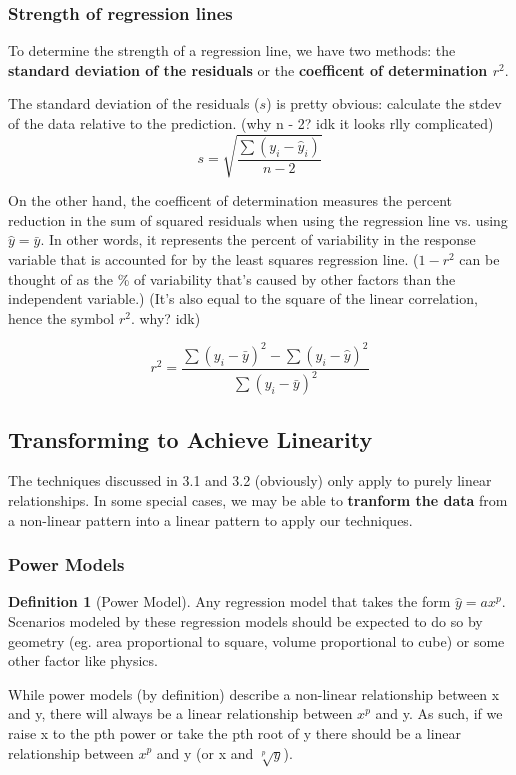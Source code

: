 \documentclass[12pt, a4paper]{article}
\theoremstyle{definition}
\newtheorem{definition}{Definition}
\begin{document}
\subsubsection{Strength of regression lines}

To determine the strength of a regression line, we have two methods: the \textbf{standard deviation of the residuals} or the \textbf{coefficent of determination $r^2$}.

The standard deviation of the residuals ($s$) is pretty obvious: calculate the stdev of the data relative to the prediction. (why n - 2? idk it looks rlly complicated)
\[s = \sqrt{\frac{\sum (y_i - \hat{y}_i)}{n - 2}}\]

On the other hand, the coefficent of determination measures the percent reduction in the sum of squared residuals when using the regression line vs. using $\hat{y} = \bar{y}$.
In other words, it represents the percent of variability in the response variable that is accounted for by the least squares regression line.
($1 - r^2$ can be thought of as the \% of variability that's caused by other factors than the independent variable.)
(It's also equal to the square of the linear correlation, hence the symbol $r^2$. why? idk)

\[r^2 = \frac{\sum (y_i - \bar{y})^2 - \sum (y_i - \hat{y})^2}{\sum (y_i - \bar{y})^2}\]

\subsection{Transforming to Achieve Linearity}

The techniques discussed in 3.1 and 3.2 (obviously) only apply to purely linear relationships.
In some special cases, we may be able to \textbf{tranform the data} from a non-linear pattern into a linear pattern to apply our techniques.

\subsubsection{Power Models}
\begin{definition}[Power Model]
    Any regression model that takes the form $\hat{y} = ax^p$.
    Scenarios modeled by these regression models should be expected to do so by geometry (eg. area proportional to square, volume proportional to cube) or some other factor like physics.
\end{definition}

While power models (by definition) describe a non-linear relationship between x and y, there will always be a linear relationship between $x^p$ and y.
As such, if we raise x to the pth power or take the pth root of y there should be a linear relationship between $x^p$ and y (or x and $\sqrt[p]{y}$).
\end{document}
